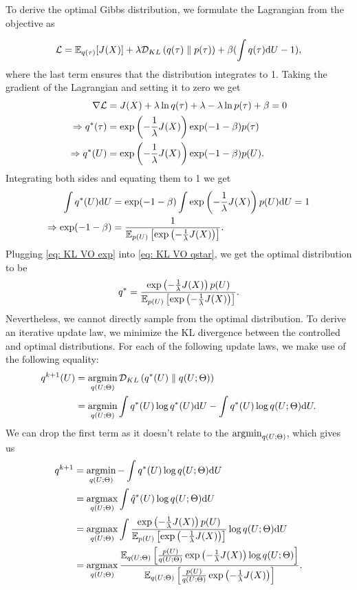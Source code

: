 \documentclass[twoside,11pt]{article}
\begin{document}
To derive the optimal Gibbs distribution, we formulate the Lagrangian from the objective as

\begin{equation}
{\cal L} = \mathbb{E}_{q(\tau)}[J(X)] + \lambda \mathcal{D}_{KL}\left({q(\tau)}\parallel {p(\tau)}\right) + \beta (\int q(\tau){\mathrm d} U - 1),
\end{equation}
where the last term ensures that the distribution integrates to 1. Taking the gradient of the Lagrangian and setting it to zero we get 
\begin{align}
\nabla {\cal L} &= J(X) + \lambda \ln q(\tau) + \lambda - \lambda \ln p(\tau) + \beta = 0\\
\Rightarrow q^*(\tau) &= \exp\left(-\frac{1}{\lambda} J(X) \right)\exp(-1-\beta)p(\tau)\\
\Rightarrow q^*(U) &= \exp\left(-\frac{1}{\lambda} J(X) \right)\exp(-1-\beta)p(U).
\label{eq: KL VO qstar}
\end{align}
Integrating both sides and equating them to 1 we get
\begin{align}
\int q^*(U) {\mathrm d} U &= \exp(-1-\beta)\int \exp\left(-\frac{1}{\lambda} J(X) \right) p(U){\mathrm d} U = 1\\
\Rightarrow \exp(-1-\beta) &= \frac{1}{\mathbb{E}_{p(U)}\left[\exp\left(-\frac{1}{\lambda}J(X)\right)\right]}.
\label{eq: KL VO exp}
\end{align}
Plugging \cref{eq: KL VO exp} into \cref{eq: KL VO qstar}, we get the optimal distribution to be
\begin{equation} \label{eq: gibbs_dist}
q^* = \frac{\exp\left(-\frac{1}{\lambda}J(X)\right)p(U)}{\mathbb{E}_{p(U)}\left[\exp\left(-\frac{1}{\lambda}J(X)\right)\right]}.
\end{equation}
Nevertheless, we cannot directly sample from the optimal distribution. To derive an iterative update law, we minimize the KL divergence between the controlled and optimal distributions. 
For each of the following update laws, we make use of the following equality:
\begin{align} \label{eq:derive:kl_vo}
    q^{k+1}(U)
    &= \argmin_{q(U;\Theta)} \KL{q^*(U)}{q(U;\Theta)} \\
    &= \argmin_{q(U;\Theta)} \int q^*(U) \log q^*(U) \rd U - \int q^*(U) \log q(U;\Theta) \rd U .
\end{align}
We can drop the first term as it doesn't relate to the $\argmin_{q(U;\Theta)}$, which gives us 
\begin{align}
    q^{k+1} &= \argmin_{q(U;\Theta)}  - \int q^*(U) \log q(U;\Theta) \rd U \\
    &= \argmax_{q(U;\Theta)} \int \hat{q}^*(U) \log q(U;\Theta) \rd U \\ 
    &= \argmax_{q(U;\Theta)} \int \frac{\exp\left(-\frac{1}{\lambda}J(X)\right)p(U)}{\Eb_{p(U)}\left[\exp\left(-\frac{1}{\lambda}J(X)\right)\right]} \log q(U;\Theta) \rd U\\
    &= \argmax_{q(U;\Theta)}  \frac{\Eb_{q(U;\Theta)}\left[\frac{p(U)}{q(U;\Theta)}\exp\left(-\frac{1}{\lambda}J(X)\right)\log q(U;\Theta)\right]}{\Eb_{q(U;\Theta)}\left[\frac{p(U)}{q(U;\Theta)}\exp\left(-\frac{1}{\lambda}J(X)\right)\right]}.
\end{align}
\end{document}
